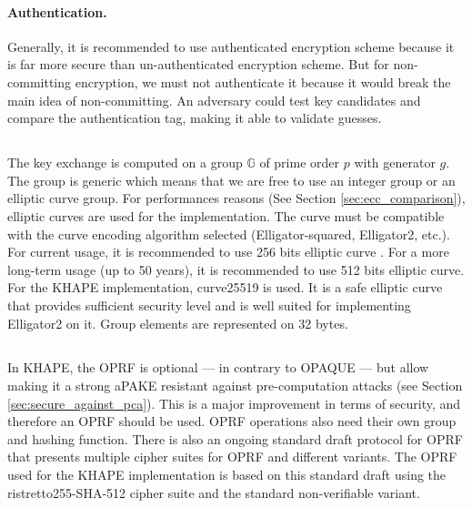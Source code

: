 ﻿\documentclass[../report.tex]{subfiles}
\begin{document}
\paragraph{Authentication.}
Generally, it is recommended to use authenticated encryption scheme because it is far more secure than un-authenticated encryption scheme. But for non-committing encryption, we must not authenticate it because it would break the main idea of non-committing. An adversary could test key candidates and compare the authentication tag, making it able to validate guesses.


\subsection{}
The key exchange is computed on a group $\mathbb{G}$ of prime order $p$ with generator $g$.
The group is generic which means that we are free to use an integer group or an elliptic curve group.
For performances reasons (See Section \ref{sec:ecc_comparison}), elliptic curves are used for the implementation.
The curve must be compatible with the curve encoding algorithm selected (Elligator-squared, Elligator2, etc.).
For current usage, it is recommended to use 256 bits elliptic curve \cite{ECRYPT_Keylength}. For a more long-term usage (up to 50 years), it is recommended to use 512 bits elliptic curve.
For the KHAPE implementation, curve25519 is used. It is a safe elliptic curve that provides sufficient security level and is well suited for implementing Elligator2 on it.
Group elements are represented on 32 bytes.


\subsection{} \label{sec:design_choice_oprf}
In KHAPE, the OPRF is optional --- in contrary to OPAQUE --- but allow making it a strong aPAKE resistant against pre-computation attacks (see Section \ref{sec:secure_against_pca}).
This is a major improvement in terms of security, and therefore an OPRF should be used.
OPRF operations also need their own group and hashing function.
There is also an ongoing standard draft protocol for OPRF \cite{VOPRF_Standard_Draft} that presents multiple cipher suites for OPRF and different variants.
The OPRF used for the KHAPE implementation is based on this standard draft using the ristretto255-SHA-512 cipher suite and the standard non-verifiable variant. %
\end{document}
